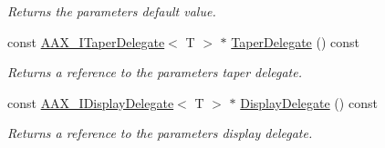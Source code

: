 \begin{Indent}
\begin{DoxyCompactItemize}
\begin{DoxyCompactList}\small\item\em Returns the parameter\textquotesingle{}s default value. \end{DoxyCompactList}\item 
const \mbox{\hyperlink{a01881}{A\+A\+X\+\_\+\+I\+Taper\+Delegate}}$<$ T $>$ $\ast$ \mbox{\hyperlink{a01537_aa0b6ab19d57453c198228c01028fd3a1}{Taper\+Delegate}} () const
\begin{DoxyCompactList}\small\item\em Returns a reference to the parameter\textquotesingle{}s taper delegate. \end{DoxyCompactList}\item 
const \mbox{\hyperlink{a01801}{A\+A\+X\+\_\+\+I\+Display\+Delegate}}$<$ T $>$ $\ast$ \mbox{\hyperlink{a01537_a6ae6348ec2a1fcc4422225c3329a302d}{Display\+Delegate}} () const
\begin{DoxyCompactList}\small\item\em Returns a reference to the parameter\textquotesingle{}s display delegate. \end{DoxyCompactList}\end{DoxyCompactItemize}
\end{Indent}
